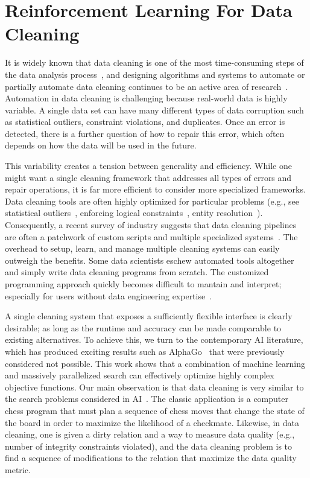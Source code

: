 \chapter{Reinforcement Learning For Data Cleaning}
It is widely known that data cleaning is one of the most time-consuming steps of the data analysis process~\cite{nytimes}, and
designing algorithms and systems to automate or partially automate data cleaning continues to be an active area of research~\cite{DBLP:conf/sigmod/ChuIKW16}.
Automation in data cleaning is challenging because real-world data is highly variable. 
A single data set can have many different types of data corruption such as statistical outliers, constraint violations, and duplicates.
Once an error is detected, there is a further question of how to repair this error, which often depends on how the data will be used in the future.

This variability creates a tension between generality and efficiency.
While one might want a single cleaning framework that addresses all types of errors and repair operations, it is far more efficient to consider more specialized frameworks.
Data cleaning tools are often highly optimized for particular problems  (e.g., see statistical outliers~\cite{hellerstein2008quantitative}, enforcing logical constraints~\cite{DBLP:conf/sigmod/ChuIKW16}, entity resolution~\cite{DBLP:journals/pvldb/KopckeTR10}). 
Consequently, a recent survey of industry suggests that data cleaning pipelines are often a patchwork of custom scripts and multiple specialized systems~\cite{krishnan2016hilda}.
The overhead to setup, learn, and manage multiple cleaning systems can easily outweigh the benefits.
Some data scientists eschew automated tools altogether and simply write data cleaning programs from scratch.
The customized programming approach quickly becomes difficult to mantain and interpret; especially for users without data engineering expertise~\cite{sculley2014machine}.

A single cleaning system that exposes a sufficiently flexible interface is clearly desirable; as long as the runtime and accuracy can be made comparable to existing alternatives.  
To achieve this, we turn to the contemporary AI literature, which has produced exciting results such as AlphaGo~\cite{silver2016mastering} that were previously considered not possible.    This work shows that a combination of machine learning and massively parallelized search can effectively optimize highly complex objective functions.
Our main observation is that data cleaning is very similar to the search problems considered in AI~\cite{russell1995modern}.
The classic application is a computer chess program that must plan a sequence of chess moves that change the state of the board in order to maximize the likelihood of a checkmate. Likewise, in data cleaning, one is given a dirty relation and a way to measure data quality (e.g., number of integrity constraints violated), and the data cleaning problem is to find a sequence of modifications to the relation that maximize the data quality metric.

